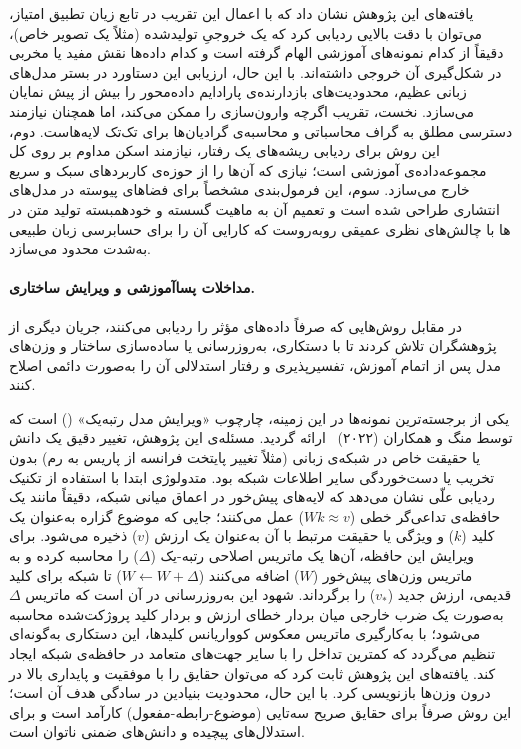 یافته‌های این پژوهش نشان داد که با اعمال این تقریب در تابع زیان تطبیق امتیاز، می‌توان با دقت بالایی ردیابی کرد که یک خروجیِ تولیدشده (مثلاً یک تصویر خاص)، دقیقاً از کدام نمونه‌های آموزشی الهام گرفته است و کدام داده‌ها نقش مفید یا مخربی در شکل‌گیری آن خروجی داشته‌اند. با این حال، ارزیابی این دستاورد در بستر مدل‌های زبانی عظیم، محدودیت‌های بازدارنده‌ی پارادایم داده‌محور را بیش از پیش نمایان می‌سازد. نخست، تقریب  اگرچه وارون‌سازی را ممکن می‌کند، اما همچنان نیازمند دسترسی مطلق به گراف محاسباتی و محاسبه‌ی گرادیان‌ها برای تک‌تک لایه‌هاست. دوم، این روش برای ردیابی ریشه‌های یک رفتار، نیازمند اسکن مداوم بر روی کل مجموعه‌داده‌ی آموزشی است؛ نیازی که آن‌ها را از حوزه‌ی کاربردهای سبک و سریع خارج می‌سازد. سوم، این فرمول‌بندی مشخصاً برای فضاهای پیوسته در مدل‌های انتشاری طراحی شده است و تعمیم آن به ماهیت گسسته و خودهمبسته تولید متن در ها با چالش‌های نظری عمیقی روبه‌روست که کارایی آن را برای حسابرسی زبان طبیعی به‌شدت محدود می‌سازد.

\paragraph{مداخلات پساآموزشی و ویرایش ساختاری.}

در مقابل روش‌هایی که صرفاً داده‌های مؤثر را ردیابی می‌کنند، جریان دیگری از پژوهشگران تلاش کردند تا با دستکاری، به‌روزرسانی یا ساده‌سازی ساختار و وزن‌های مدل پس از اتمام آموزش، تفسیرپذیری و رفتار استدلالی آن را به‌صورت دائمی اصلاح کنند.

یکی از برجسته‌ترین نمونه‌ها در این زمینه، چارچوب «ویرایش مدل رتبه‌یک» () است که توسط منگ و همکاران (۲۰۲۲)~\cite{meng2022locating} ارائه گردید. مسئله‌ی این پژوهش، تغییر دقیق یک دانش یا حقیقت خاص در شبکه‌ی زبانی (مثلاً تغییر پایتخت فرانسه از پاریس به رم) بدون تخریب یا دست‌خوردگی سایر اطلاعات شبکه بود. متدولوژی  ابتدا با استفاده از تکنیک ردیابی علّی نشان می‌دهد که لایه‌های پیش‌خور در اعماق میانی شبکه، دقیقاً مانند یک حافظه‌ی تداعی‌گر خطی ($W k \approx v$) عمل می‌کنند؛ جایی که موضوع گزاره به‌عنوان یک کلید ($k$) و ویژگی یا حقیقت مرتبط با آن به‌عنوان یک ارزش ($v$) ذخیره می‌شود. برای ویرایش این حافظه، آن‌ها یک ماتریس اصلاحی رتبه‌-یک ($\Delta$) را محاسبه کرده و به ماتریس وزن‌های پیش‌خور ($W$) اضافه می‌کنند ($W \leftarrow W + \Delta$) تا شبکه برای کلید قدیمی، ارزش جدید ($v_*$) را برگرداند. شهود این به‌روزرسانی در آن است که ماتریس $\Delta$ به‌صورت یک ضرب خارجی میان بردار خطای ارزش و بردار کلید پروژکت‌شده محاسبه می‌شود؛ با به‌کارگیری ماتریس معکوس کوواریانس کلیدها، این دستکاری به‌گونه‌ای تنظیم می‌گردد که کمترین تداخل را با سایر جهت‌های متعامد در حافظه‌ی شبکه ایجاد کند. یافته‌های این پژوهش ثابت کرد که می‌توان حقایق را با موفقیت و پایداری بالا در درون وزن‌ها بازنویسی کرد. با این حال، محدودیت بنیادین  در سادگی هدف آن است؛ این روش صرفاً برای حقایق صریح سه‌تایی (موضوع-رابطه-مفعول) کارآمد است و برای استدلال‌های پیچیده و دانش‌های ضمنی ناتوان است.

